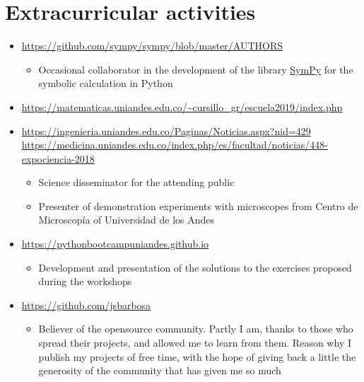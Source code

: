 \documentclass[11pt, letterpaper, sans]{moderncv}        %
\begin{document}
\section{Extracurricular activities}
	\begin{itemize}
		\item{
			{
				\url{https://github.com/sympy/sympy/blob/master/AUTHORS}
				\vspace{3pt}
				\begin{itemize}
					\item Occasional collaborator in the development of the library \href{https://www.sympy.org/en/index.html}{\color{blue}SymPy} for the symbolic calculation in {\color{blue}Python}
				\end{itemize}
			}
		}
		\item{
			{
				\url{https://matematicas.uniandes.edu.co/~cursillo_gr/escuela2019/index.php}
			}
		}
	
		\item{
			{
				\url{https://ingenieria.uniandes.edu.co/Paginas/Noticias.aspx?nid=429}\\
				\url{https://medicina.uniandes.edu.co/index.php/es/facultad/noticias/448-expociencia-2018}
				\vspace{3pt}
				\begin{itemize}
					\item Science disseminator for the attending public
					\item Presenter of demonstration experiments with microscopes from Centro de Microscop\'ia of Universidad de los Andes
				\end{itemize}
			}
		}
	
		\item{
			{
				\url{https://pythonbootcampuniandes.github.io}
				\vspace{3pt}
				\begin{itemize}
					\item Development and presentation of the solutions to the exercises proposed during the workshops
				\end{itemize}
			}
		}
	
		\item{
			{
				\url{https://github.com/jsbarbosa}
				\vspace{3pt}
				\begin{itemize}
					\item Believer of the opensource community. Partly I am, thanks to those who spread their projects, and allowed me to learn from them. Reason why I publish my projects of free time, with the hope of giving back a little the generosity of the community that has given me so much
				\end{itemize}
			}
		}
	\end{itemize}
\end{document}
